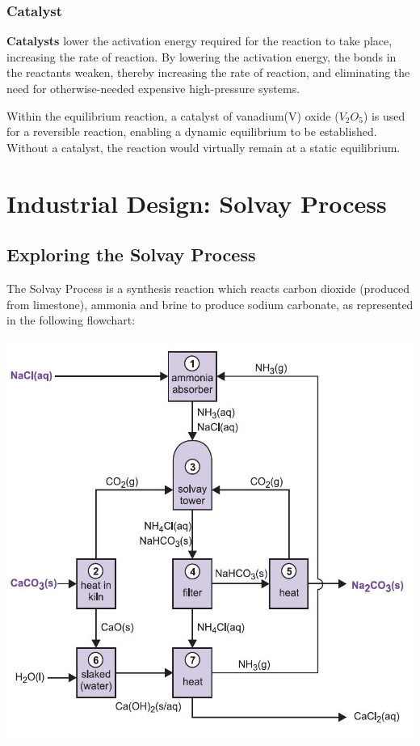\documentclass[12pt, a4paper]{article}
\begin{document}
\subsubsection{Catalyst}

\textbf{Catalysts} lower the activation energy required for the reaction to take place, increasing the rate of reaction. By lowering the activation energy, the bonds in the reactants weaken, thereby increasing the rate of reaction, and eliminating the need for otherwise-needed expensive high-pressure systems. 

Within the equilibrium reaction, a catalyst of vanadium(V) oxide (\(V_{2}O_{5}\)) is used for a reversible reaction, enabling a dynamic equilibrium to be established. Without a catalyst, the reaction would virtually remain at a static equilibrium.






\section{Industrial Design: Solvay Process}

\subsection{Exploring the Solvay Process}

The Solvay Process is a synthesis reaction which reacts carbon dioxide (produced from limestone), ammonia and brine to produce sodium carbonate, as represented in the following flowchart:

\begin{center}
\includegraphics[scale=0.6]{solvay.jpeg}
\\
\end{center}
\end{document}
